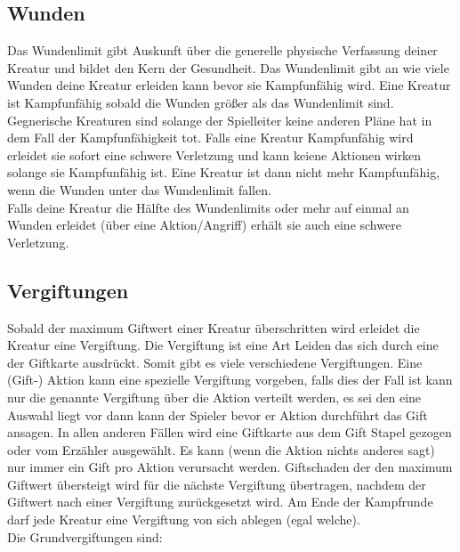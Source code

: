 \subsection*{Wunden}
Das Wundenlimit gibt Auskunft über die generelle physische Verfassung deiner Kreatur und bildet den Kern der Gesundheit. Das Wundenlimit gibt an wie viele Wunden deine Kreatur erleiden kann bevor sie Kampfunfähig wird.
Eine Kreatur ist Kampfunfähig sobald die Wunden größer als das Wundenlimit sind. Gegnerische Kreaturen sind solange der Spielleiter keine anderen Pläne hat in dem Fall der Kampfunfähigkeit tot. Falls eine Kreatur Kampfunfähig wird erleidet sie sofort eine schwere Verletzung und kann keiene Aktionen wirken solange sie Kampfunfähig ist. Eine Kreatur ist dann nicht mehr Kampfunfähig, wenn die Wunden unter das Wundenlimit fallen.\\
Falls deine Kreatur die Hälfte des Wundenlimits oder mehr auf einmal an Wunden erleidet (über eine Aktion/Angriff) erhält sie auch eine schwere Verletzung.

\subsection*{Vergiftungen}
Sobald der maximum Giftwert einer Kreatur überschritten wird erleidet die Kreatur eine Vergiftung. Die Vergiftung ist eine Art Leiden das sich durch eine der Giftkarte ausdrückt. Somit gibt es viele verschiedene Vergiftungen. Eine (Gift-) Aktion kann eine spezielle Vergiftung vorgeben, falls dies der Fall ist kann nur die genannte Vergiftung über die Aktion verteilt werden, es sei den eine Auswahl liegt vor dann kann der Spieler bevor er Aktion durchführt das Gift ansagen. In allen anderen Fällen wird eine Giftkarte aus dem Gift Stapel gezogen oder vom Erzähler ausgewählt.
Es kann (wenn die Aktion nichts anderes sagt) nur immer ein Gift pro Aktion verursacht werden. Giftschaden der den maximum Giftwert übersteigt wird für die nächste Vergiftung übertragen, nachdem der Giftwert nach einer Vergiftung zurückgesetzt wird.
Am Ende der Kampfrunde darf jede Kreatur eine Vergiftung von sich ablegen (egal welche).\\
Die Grundvergiftungen sind:

